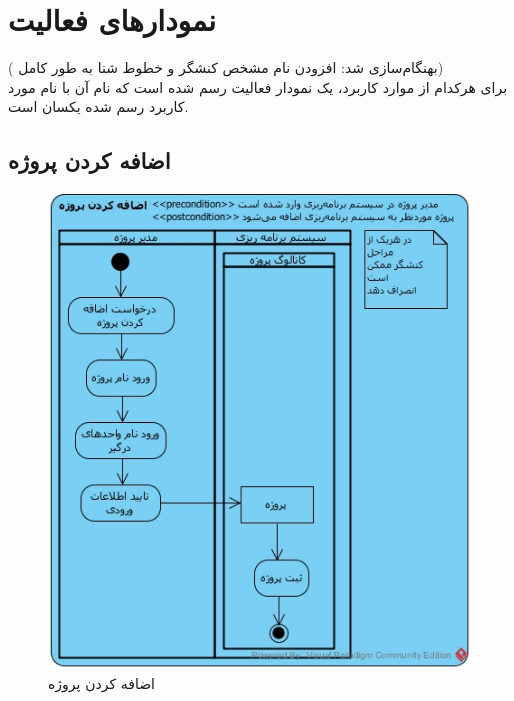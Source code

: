 \chapter{نمودارهای فعالیت}
({\color{red} بهنگام‌سازی شد: افزودن نام مشخص کنشگر و خطوط شنا به طور کامل})
\\
برای هرکدام از موارد کاربرد، یک نمودار فعالیت رسم شده است که نام آن با نام مورد کاربرد رسم شده یکسان است.
\section{اضافه کردن پروژه}
\begin{figure}[H]
	\centering
	\includegraphics[scale=0.9]{img/activity/AddProjectToOrganization}
	\caption{اضافه کردن پروژه}
\end{figure}

